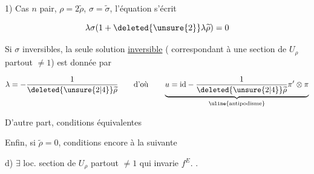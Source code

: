 1) Cas $n$ pair, $\rho=2\widetilde\rho$, $\sigma=\widetilde\sigma$, l'équation s'écrit

\[
\lambda\sigma(1+\deleted{\unsure{2}}\lambda\widetilde\rho)=0
\]

Si $\sigma$  inversibles, la seule solution \uline{inversible} ( correspondant à une section de $U_\rho$ partout $\ne 1$) est donnée par

\[
\lambda=-\frac{1}{\deleted{\unsure{2|4}}\widetilde\rho}\qquad
\text{d'où}\qquad
\underbrace{u=\mathrm{id}-\frac{1}{\deleted{\unsure{2|4}}\widetilde\rho}\pi'\otimes\pi}_{\text{\uline{antipodisme}}}
\]


D'autre part, conditions équivalentes


Enfin, si $\widetilde\rho=0$,  conditions  encore à la suivante


d) $\exists$ loc. section  de $U_\rho$ partout $\ne1$ qui invarie $f^E$. .
